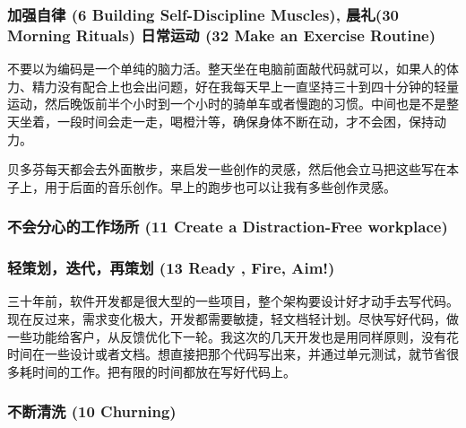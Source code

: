 \hypertarget{ux52a0ux5f3aux81eaux5f8b-6-building-self-discipline-muscles-ux6668ux793c30-morning-rituals-ux65e5ux5e38ux8fd0ux52a8-32-make-an-exercise-routine}{%
\subsubsection{加强自律 (6 Building Self-Discipline Muscles), 晨礼(30
Morning Rituals) 日常运动 (32 Make an Exercise
Routine)}\label{ux52a0ux5f3aux81eaux5f8b-6-building-self-discipline-muscles-ux6668ux793c30-morning-rituals-ux65e5ux5e38ux8fd0ux52a8-32-make-an-exercise-routine}}

不要以为编码是一个单纯的脑力活。整天坐在电脑前面敲代码就可以，如果人的体力、精力没有配合上也会出问题，好在我每天早上一直坚持三十到四十分钟的轻量运动，然后晚饭前半个小时到一个小时的骑单车或者慢跑的习惯。中间也是不是整天坐着，一段时间会走一走，喝橙汁等，确保身体不断在动，才不会困，保持动力。

贝多芬每天都会去外面散步，来启发一些创作的灵感，然后他会立马把这些写在本子上，用于后面的音乐创作。早上的跑步也可以让我有多些创作灵感。

\hypertarget{ux4e0dux4f1aux5206ux5fc3ux7684ux5de5ux4f5cux573aux6240-11-create-a-distraction-free-workplace}{%
\subsubsection{不会分心的工作场所 (11 Create a Distraction-Free
workplace)}\label{ux4e0dux4f1aux5206ux5fc3ux7684ux5de5ux4f5cux573aux6240-11-create-a-distraction-free-workplace}}

\hypertarget{ux8f7bux7b56ux5212ux8fedux4ee3ux518dux7b56ux5212-13-ready-fire-aim}{%
\subsubsection{轻策划，迭代，再策划 (13 Ready , Fire,
Aim!)}\label{ux8f7bux7b56ux5212ux8fedux4ee3ux518dux7b56ux5212-13-ready-fire-aim}}

三十年前，软件开发都是很大型的一些项目，整个架构要设计好才动手去写代码。现在反过来，需求变化极大，开发都需要敏捷，轻文档轻计划。尽快写好代码，做一些功能给客户，从反馈优化下一轮。我这次的几天开发也是用同样原则，没有花时间在一些设计或者文档。想直接把那个代码写出来，并通过单元测试，就节省很多耗时间的工作。把有限的时间都放在写好代码上。

\hypertarget{ux4e0dux65adux6e05ux6d17-10-churning}{%
\subsubsection{不断清洗 (10
Churning)}\label{ux4e0dux65adux6e05ux6d17-10-churning}}

